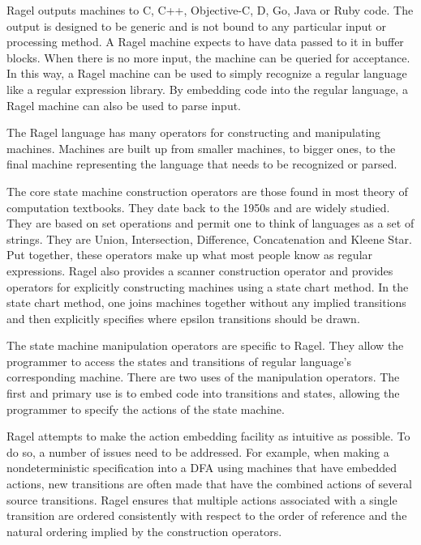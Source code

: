 \documentclass[letterpaper,11pt,oneside]{book}
\begin{document}
Ragel outputs machines to C, C++, Objective-C, D, Go, Java or Ruby code. The output is
designed to be generic and is not bound to any particular input or processing
method. A Ragel machine expects to have data passed to it in buffer blocks.
When there is no more input, the machine can be queried for acceptance.  In
this way, a Ragel machine can be used to simply recognize a regular language
like a regular expression library. By embedding code into the regular language,
a Ragel machine can also be used to parse input.

The Ragel language has many operators for constructing and manipulating
machines. Machines are built up from smaller machines, to bigger ones, to the
final machine representing the language that needs to be recognized or parsed.

The core state machine construction operators are those found in most theory
of computation textbooks. They date back to the 1950s and are widely studied.
They are based on set operations and permit one to think of languages as a set
of strings. They are Union, Intersection, Difference, Concatenation and Kleene
Star. Put together, these operators make up what most people know as regular
expressions. Ragel also provides a scanner construction operator 
and provides operators for explicitly constructing machines
using a state chart method. In the state chart method, one joins machines
together without any implied transitions and then explicitly specifies where
epsilon transitions should be drawn.

The state machine manipulation operators are specific to Ragel. They allow the
programmer to access the states and transitions of regular language's
corresponding machine. There are two uses of the manipulation operators. The
first and primary use is to embed code into transitions and states, allowing
the programmer to specify the actions of the state machine.

Ragel attempts to make the action embedding facility as intuitive as possible.
To do so, a number of issues need to be addressed.  For example, when making a
nondeterministic specification into a DFA using machines that have embedded
actions, new transitions are often made that have the combined actions of
several source transitions. Ragel ensures that multiple actions associated with
a single transition are ordered consistently with respect to the order of
reference and the natural ordering implied by the construction operators.
\end{document}
